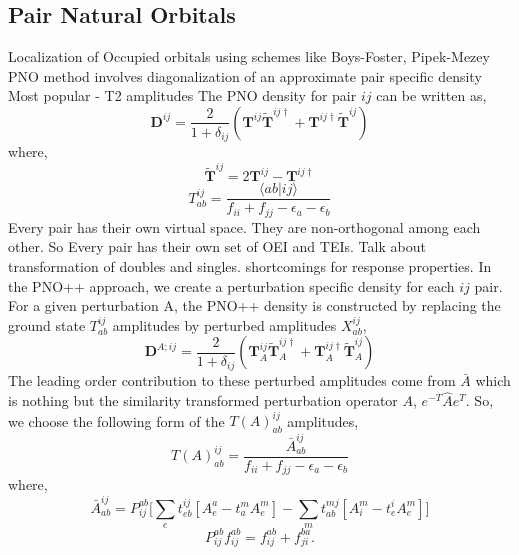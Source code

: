 \subsection{Pair Natural Orbitals}
Localization of Occupied orbitals using schemes like Boys-Foster, Pipek-Mezey
PNO method involves diagonalization of an approximate pair specific density
Most popular - T2 amplitudes
The PNO density for pair $ij$ can be written as,
\begin{equation}
\bm{D}^{ij} = \frac{2}{1+\delta_{ij}} (\bm{T}^{ij}\tilde{\bm{T}}^{ij\dagger} + \bm{T}^{ij\dagger}\tilde{\bm{T}}^{ij})
\end{equation}
where, 
\begin{equation}
\tilde{\bm{T}}^{ij} = 2\bm{T}^{ij} - \bm{T}^{ij\dagger}
\end{equation} 
\begin{equation}
T^{ij}_{ab} = \frac{\langle ab|ij \rangle}{f_{ii} + f_{jj} - \epsilon_a - \epsilon_b}
\end{equation} 
Every pair has their own virtual space. They are non-orthogonal among each other. So 
Every pair has their own set of OEI and TEIs. Talk about transformation of doubles 
and singles. shortcomings for response properties. 
In the PNO++ approach, we create a perturbation specific density for each $ij$ pair. For a given
perturbation A, the PNO++ density is constructed by replacing the ground state $T^{ij}_{ab}$ amplitudes 
by perturbed amplitudes $X^{ij}_{ab}$,
\begin{equation}
\bm{D}^{A;ij} = \frac{2}{1+\delta_{ij}} (\bm{T}_{A}^{ij}\bm{\tilde{T}}_{A}^{ij\dagger} + \bm{T}_{A}^{ij\dagger}\bm{\tilde{T}}_{A}^{ij})
\end{equation}
The leading order contribution to these perturbed amplitudes come from $\bar{A}$ which is nothing but 
the similarity transformed perturbation operator $A$, $e^{-T}\hat{A}e^{T}$. So, we choose the following
form of the $T(A)^{ij}_{ab}$ amplitudes,
\begin{equation}
T(A)^{ij}_{ab} =  \frac{\bar{A}^{ij}_{ab}}{f_{ii} + f_{jj} - \epsilon_a - \epsilon_b} 
\end{equation} 
where,
\begin{equation}
\bar{A}^{ij}_{ab} = P_{ij}^{ab}\bigg[\sum_e t^{ij}_{eb}[A^a_e - t^m_a A^m_e] -\sum_m t^{mj}_{ab}[A^m_i - t^i_e A^m_e]\bigg]
\end{equation} 
\begin{equation}
P_{ij}^{ab} f_{ij}^{ab} = f_{ij}^{ab} + f_{ji}^{ba} .
\end{equation}
